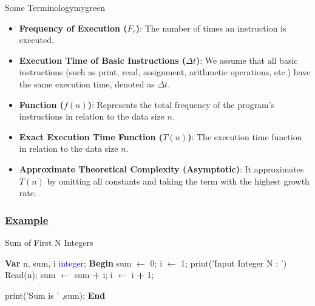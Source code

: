 \begin{prettyBox}{Some Terminology}{mygreen}
\begin{itemize}
    \item \textbf{Frequency of Execution (\(F_r\))}: The number of times an instruction is executed.
    \item \textbf{Execution Time of Basic Instructions (\(\Delta t\))}: We assume that all basic instructions
(such as print, read, assignment, arithmetic operations, etc.) have the same execution time, denoted as \(\Delta t\).
    \item \textbf{Function (\(f(n)\))}: Represents the total frequency of the program's instructions in relation to the data size \(n\).
    \item \textbf{Exact Execution Time Function (\(T(n)\))}: The execution time function in relation to the data size \(n\).
    \item \textbf{Approximate Theoretical Complexity (Asymptotic)}: 
It approximates \(T(n)\) by omitting all constants and taking the term with the highest growth rate.
\end{itemize}
\end{prettyBox}

\vspace{0.1cm}
\subsubsection*{\underline{Example}}

\begin{algorithm}
\caption{Sum of First N Integers}
\begin{algorithmic}[1]
\State \textbf{\textcolor{redPlot}{Var}}
\State n, sum, i \textcolor{blue}{integer};
\vspace{0.5em}
\State  \textbf{\textcolor{redPlot}{Begin}}
\State sum $\gets$ 0; 
\State  i $\gets$ 1;
\vspace{0.5em}
\State \textcolor{purplePlot!80!black}{print}(\textcolor{blueArea!60!black}{'Input Integer N : '}) 
\State \textcolor{purplePlot!80!black}{Read}(n);
\vspace{0.5em}
\State sum $\gets$ sum \textcolor{redPlot}{ \textbf{+}} i; 
\State i $\gets$ i \textcolor{redPlot}{ \textbf{+}} 1; 
\EndWhile

\vspace{0.5em}
\State \textcolor{purplePlot!80!black}{print}(\textcolor{blueArea!60!black}{'Sum is ' },{sum});
\vspace{0.5em}
\State  \textbf{\textcolor{redPlot}{End}}
\end{algorithmic}
\end{algorithm}

